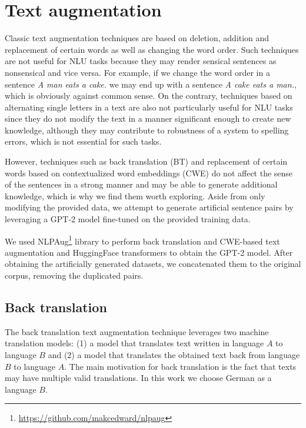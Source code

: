\documentclass[10pt, a4paper]{article}
\begin{document}
\section{Text augmentation}
\label{aug}
Classic text augmentation techniques are based on deletion, addition and replacement of certain words as well as changing the word order. Such techniques are not useful for NLU tasks because they may render sensical sentences as nonsensical and vice versa. For example, if we change the word order in a sentence \textit{A man eats a cake.} we may end up with a sentence \textit{A cake eats a man.}, which is obviously against common sense. On the contrary, techniques based on alternating single letters in a text are also not particularly useful for NLU tasks since they do not modify the text in a manner significant enough to create new knowledge, although they may contribute to robustness of a system to spelling errors, which is not essential for such tasks.

However, techniques such as back translation (BT) and replacement of certain words based on contextualized word embeddings (CWE) do not affect the sense of the sentences in a strong manner and may be able to generate additional knowledge, which is why we find them worth exploring. Aside from only modifying the provided data, we attempt to generate artificial sentence pairs by leveraging a GPT-2 model fine-tuned on the provided training data.

We used NLPAug\footnote{\href{https://github.com/makcedward/nlpaug}{https://github.com/makcedward/nlpaug}} library to perform back translation and CWE-based text augmentation and HuggingFace transformers to obtain the GPT-2 model. After obtaining the artificially generated datasets, we concatenated them to the original corpus, removing the duplicated pairs.


\subsection{Back translation}
The back translation text augmentation technique leverages two machine translation models: (1) a model that translates text written in language $A$ to language $B$ and (2) a model that translates the obtained text back from language $B$ to language $A$. The main motivation for back translation is the fact that texts may have multiple valid translations. In this work we choose German as a language $B$.
\end{document}
